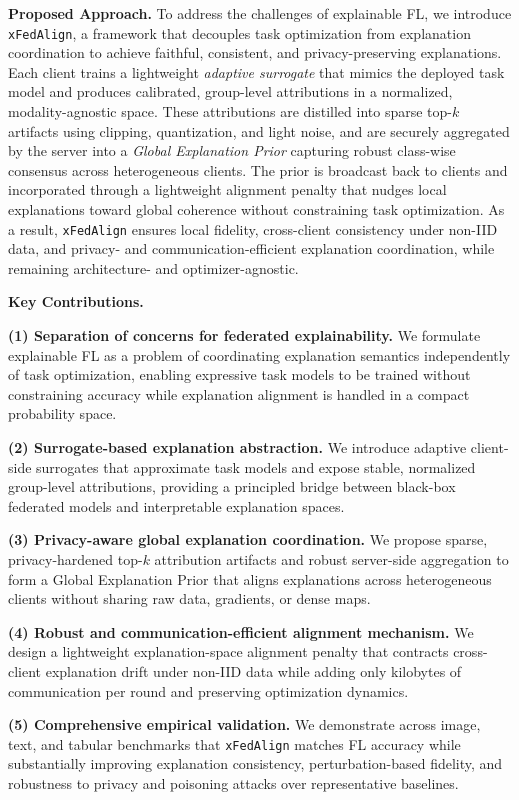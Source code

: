 \documentclass{article}
\theoremstyle{plain}
\theoremstyle{definition}
\theoremstyle{remark}
\begin{document}
\textbf{Proposed Approach.}
To address the challenges of explainable FL, we introduce \texttt{xFedAlign}, a framework that decouples task optimization from explanation coordination to achieve faithful, consistent, and privacy-preserving explanations. Each client trains a lightweight \emph{adaptive surrogate} that mimics the deployed task model and produces calibrated, group-level attributions in a normalized, modality-agnostic space. These attributions are distilled into sparse top-$k$ artifacts using clipping, quantization, and light noise, and are securely aggregated by the server into a \emph{Global Explanation Prior} capturing robust class-wise consensus across heterogeneous clients. The prior is broadcast back to clients and incorporated through a lightweight alignment penalty that nudges local explanations toward global coherence without constraining task optimization. As a result, \texttt{xFedAlign} ensures local fidelity, cross-client consistency under non-IID data, and privacy- and communication-efficient explanation coordination, while remaining architecture- and optimizer-agnostic.

\textbf{Key Contributions.}

\textbf{(1) Separation of concerns for federated explainability.} We formulate explainable FL as a problem of coordinating explanation semantics independently of task optimization, enabling expressive task models to be trained without constraining accuracy while explanation alignment is handled in a compact probability space. 

\textbf{(2) Surrogate-based explanation abstraction.} We introduce adaptive client-side surrogates that approximate task models and expose stable, normalized group-level attributions, providing a principled bridge between black-box federated models and interpretable explanation spaces.

\textbf{(3) Privacy-aware global explanation coordination.} We propose sparse, privacy-hardened top-$k$ attribution artifacts and robust server-side aggregation to form a Global Explanation Prior that aligns explanations across heterogeneous clients without sharing raw data, gradients, or dense maps.

\textbf{(4) Robust and communication-efficient alignment mechanism.} We design a lightweight explanation-space alignment penalty that contracts cross-client explanation drift under non-IID data while adding only kilobytes of communication per round and preserving optimization dynamics.


\textbf{(5) Comprehensive empirical validation.} We demonstrate across image, text, and tabular benchmarks that \texttt{xFedAlign} matches FL accuracy while substantially improving explanation consistency, perturbation-based fidelity, and robustness to privacy and poisoning attacks over representative baselines.
\end{document}
